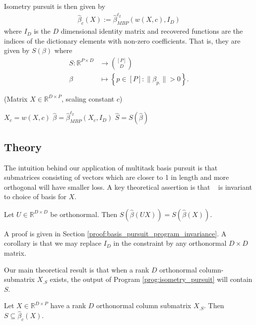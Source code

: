 Isometry pursuit is then given by
\begin{align}
\label{prog:isometry_pursuit}
\widehat \beta_c ( X) := \widehat \beta_{MBP}^{\ell_2} ( w(X,c), I_D )
\end{align}
where $I_D$ is the $D$ dimensional identity matrix and recovered functions are the indices of the dictionary elements with non-zero coefficients.
That is, they are given by $S(\beta)$ where
\begin{align}
S: \mathbb{R}^{P \times D} &\to \binom{[P]}{D} \\
\beta &\mapsto \left\{ p \in [P] :  \|\beta_{p.}\| > 0 \right\}.
\end{align}
\begin{algorithm}[H]
\caption{\isometrypursuit(Matrix ${X} \in \mathbb{R}^{D \times P}$, scaling constant $c$)}
\begin{algorithmic}[1]
 $X_c = w({X},c)$
 $\widehat \beta = \widehat \beta_{MBP}^{\ell_2} (X_c, I_D)$
 $\widehat{S} = S (\widehat \beta)$
\end{algorithmic}
\end{algorithm}

\subsection{Theory}

The intuition behind our application of multitask basis pursuit is that submatrices consisting of vectors which are closer to 1 in length and more orthogonal will have smaller loss.
A key theoretical assertion is that \isometrypursuit~ is invariant to choice of basis for $ X$.
\begin{proposition}
\label{prop:basis_pursuit_selection_invariance}
Let $U \in \mathbb R^{D \times D}$ be orthonormal.
Then $S(\widehat \beta  (U  X)) = S(\widehat \beta ( X))$.
\end{proposition}
A proof is given in Section \ref{proof:basis_pursuit_program_invariance}.
A corollary is that we may replace $I_D$ in the constraint by any orthonormal $D \times D$ matrix.

Our main theoretical result is that when a rank $D$ orthonormal column-submatrix $X_{.S}$ exists, the output of Program \ref{prog:isometry_pursuit} will contain $S$.
\begin{proposition}
Let $X \in \mathbb R^{D \times P}$ have a rank $D$ orthonormal column submatrix $X_{.S}$.
Then $S \subseteq \widehat \beta_c ( X)$.
\label{prop:unitary_selection}
\end{proposition}

